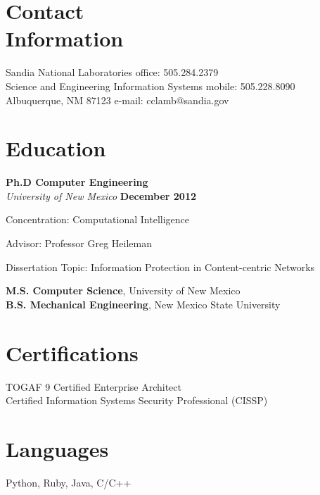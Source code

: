 \documentclass[margin,line]{resume}
\begin{document}
\begin{resume}

\section{\mysidestyle Contact\\Information}
Sandia National Laboratories					\hfill office: 505.284.2379				\vspace{0mm}\\\vspace{0mm}%
Science and Engineering Information Systems	\hfill mobile: 505.228.8090      		\vspace{0mm}\\\vspace{0mm}%
Albuquerque, NM 87123						\hfill e-mail: cclamb@sandia.gov		  	\vspace{0mm}\\\vspace{-4.5mm}%

\section{\mysidestyle Education}

\textbf{Ph.D Computer Engineering} \\
\textsl{University of New Mexico} \hfill \textbf{ December 2012 } \\\vspace{-3mm}%
\begin{list2}
\item Concentration: Computational Intelligence
\item Advisor:  Professor Greg Heileman
\item Dissertation Topic: Information Protection in Content-centric Networks
\end{list2}
{\bf M.S. Computer Science}, University of New Mexico \\
{\bf B.S. Mechanical Engineering}, New Mexico State University

\section{\mysidestyle Certifications}
TOGAF 9 Certified Enterprise Architect \\
Certified Information Systems Security Professional (CISSP)

\section{\mysidestyle Languages}
Python, Ruby, Java, C/C++


\end{resume}
\end{document}
